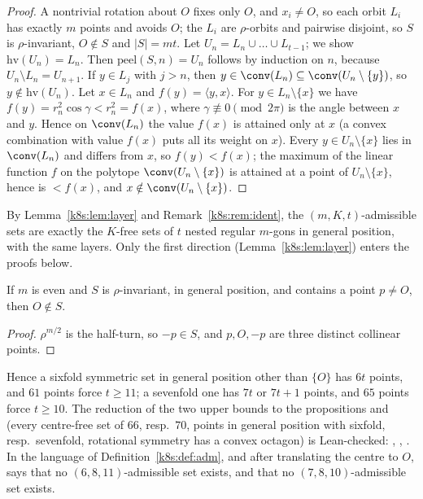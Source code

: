 \begin{proof}
A nontrivial rotation about $O$ fixes only $O$, and $x_i\ne O$, so each orbit $L_i$ has exactly $m$ points and avoids
$O$; the $L_i$ are $\rho$-orbits and pairwise disjoint, so $S$ is $\rho$-invariant, $O\notin S$ and $|S|=mt$. Let
$U_n=L_n\cup\dots\cup L_{t-1}$; we show $\mathrm{hv}(U_n)=L_n$. Then $\mathrm{peel}(S,n)=U_n$ follows by induction on $n$,
because $U_n\setminus L_n=U_{n+1}$.
If $y\in L_j$ with $j>n$, then $y\in\conv(L_n)\subseteq\conv(U_n\setminus\{y\})$, so $y\notin\mathrm{hv}(U_n)$. Let
$x\in L_n$ and $f(y)=\langle y,x\rangle$. For $y\in L_n\setminus\{x\}$ we have $f(y)=r_n^2\cos\gamma<r_n^2=f(x)$, where
$\gamma\not\equiv0\pmod{2\pi}$ is the angle between $x$ and $y$. Hence on $\conv(L_n)$ the value $f(x)$ is attained only at
$x$ (a convex combination with value $f(x)$ puts all its weight on $x$). Every $y\in U_n\setminus\{x\}$ lies in
$\conv(L_n)$ and differs from $x$, so $f(y)<f(x)$; the maximum of the linear function $f$ on the polytope
$\conv(U_n\setminus\{x\})$ is attained at a point of $U_n\setminus\{x\}$, hence is $<f(x)$, and $x\notin\conv(U_n\setminus\{x\})$.
\end{proof}

By Lemma~\ref{k8s:lem:layer} and Remark~\ref{k8s:rem:ident}, the $(m,K,t)$-admissible sets are exactly the $K$-free
sets of $t$ nested regular $m$-gons in general position, with the same layers. Only the first direction
(Lemma~\ref{k8s:lem:layer}) enters the proofs below.

\begin{lemma}\label{k8s:lem:centre}
If $m$ is even and $S$ is $\rho$-invariant, in general position, and contains a point $p\ne O$, then $O\notin S$.
\end{lemma}

\begin{proof}
$\rho^{m/2}$ is the half-turn, so $-p\in S$, and $p,O,-p$ are three distinct collinear points.
\end{proof}

Hence a sixfold symmetric set in general position other than $\{O\}$ has $6t$ points, and $61$ points force $t\ge11$;
a sevenfold one has $7t$ or $7t+1$ points, and $65$ points force $t\ge10$. The reduction of the two upper bounds to
the propositions  and  (every centre-free set of $66$, resp.\ $70$, points in general
position with sixfold, resp.\ sevenfold, rotational symmetry has a convex octagon) is Lean-checked:
, , . In the language of
Definition~\ref{k8s:def:adm}, and after translating the centre to $O$,  says that no
$(6,8,11)$-admissible set exists, and  that no $(7,8,10)$-admissible set exists.

